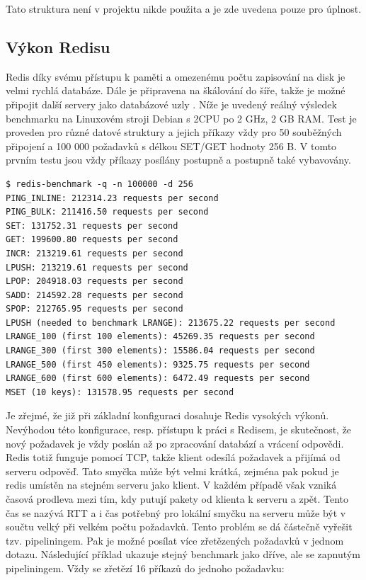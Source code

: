 Tato struktura není v projektu nikde použita a je zde uvedena pouze pro úplnost.

\subsection{Výkon Redisu}
Redis díky svému přístupu k paměti a omezenému počtu zapisování na disk je velmi rychlá databáze. Dále je připravena na škálování do šíře, takže je možné připojit další servery jako databázové uzly \cite{redis-cluster}. Níže je uvedený reálný výsledek benchmarku \cite{redis-benchmark} na Linuxovém stroji Debian s 2\texttimes CPU po 2 GHz, 2 GB RAM. Test je proveden pro různé datové struktury a jejich příkazy vždy pro 50 souběžných připojení a 100 000 požadavků s délkou SET/GET hodnoty 256 B. V tomto prvním testu jsou vždy příkazy posílány postupně a postupně také vybavovány.

\begin{verbatim}
$ redis-benchmark -q -n 100000 -d 256
PING_INLINE: 212314.23 requests per second
PING_BULK: 211416.50 requests per second
SET: 131752.31 requests per second
GET: 199600.80 requests per second
INCR: 213219.61 requests per second
LPUSH: 213219.61 requests per second
LPOP: 204918.03 requests per second
SADD: 214592.28 requests per second
SPOP: 212765.95 requests per second
LPUSH (needed to benchmark LRANGE): 213675.22 requests per second
LRANGE_100 (first 100 elements): 45269.35 requests per second
LRANGE_300 (first 300 elements): 15586.04 requests per second
LRANGE_500 (first 450 elements): 9325.75 requests per second
LRANGE_600 (first 600 elements): 6472.49 requests per second
MSET (10 keys): 131578.95 requests per second
\end{verbatim}

Je zřejmé, že již při základní konfiguraci dosahuje Redis vysokých výkonů. Nevýhodou této konfigurace, resp. přístupu k práci s Redisem, je skutečnost, že nový požadavek je vždy poslán až po zpracování databází a vrácení odpovědi. Redis totiž funguje pomocí TCP, takže klient odesílá požadavek a přijímá od serveru odpověď. Tato smyčka může být velmi krátká, zejména pak pokud je redis umístěn na stejném serveru jako klient. V každém případě však vzniká časová prodleva mezi tím, kdy putují pakety od klienta k serveru a zpět. Tento čas se nazývá RTT a i čas potřebný pro lokální smyčku na serveru může být v součtu velký při velkém počtu požadavků. Tento problém se dá částečně vyřešit tzv. pipeliningem. Pak je možné posílat více zřetězených požadavků v jednom dotazu. Následující příklad ukazuje stejný benchmark jako dříve, ale se zapnutým pipeliningem. Vždy se zřetězí 16 příkazů do jednoho požadavku:

